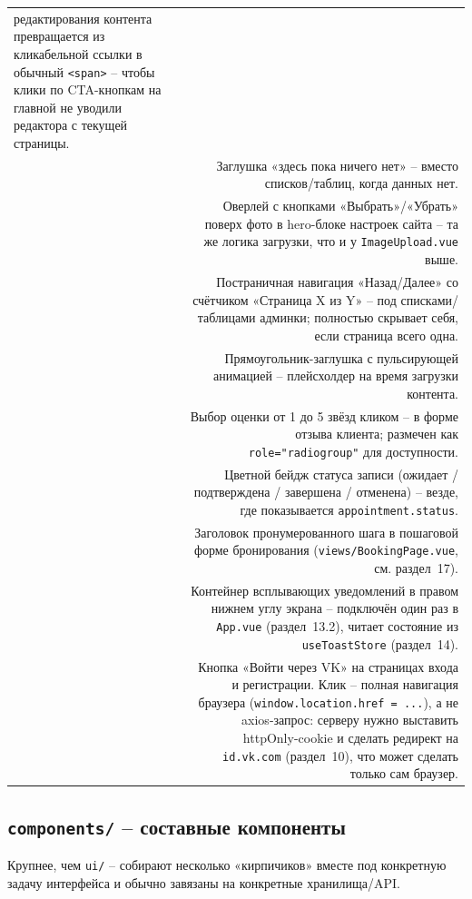 \begin{xltabular}{\textwidth}{M D}
  редактирования контента превращается из кликабельной ссылки в обычный
  \texttt{<span>} -- чтобы клики по CTA-кнопкам на главной не уводили
  редактора с текущей страницы. \\
 & Заглушка «здесь пока ничего нет» -- вместо
  списков/таблиц, когда данных нет. \\
 & Оверлей с кнопками «Выбрать»/«Убрать»
  поверх фото в hero-блоке настроек сайта -- та же логика загрузки, что и
  у \texttt{ImageUpload.vue} выше. \\
 & Постраничная навигация «Назад/Далее» со
  счётчиком «Страница X из Y» -- под списками/таблицами админки; полностью
  скрывает себя, если страница всего одна. \\
 & Прямоугольник-заглушка с пульсирующей анимацией
  -- плейсхолдер на время загрузки контента. \\
 & Выбор оценки от 1 до 5 звёзд кликом -- в
  форме отзыва клиента; размечен как \texttt{role="radiogroup"} для
  доступности. \\
 & Цветной бейдж статуса записи (ожидает /
  подтверждена / завершена / отменена) -- везде, где показывается
  \texttt{appointment.status}. \\
 & Заголовок пронумерованного шага в пошаговой
  форме бронирования (\texttt{views/BookingPage.vue}, см. раздел~17). \\
 & Контейнер всплывающих уведомлений в правом
  нижнем углу экрана -- подключён один раз в \texttt{App.vue}
  (раздел~13.2), читает состояние из \texttt{useToastStore} (раздел~14). \\
 & Кнопка «Войти через VK» на страницах входа
  и регистрации. Клик -- полная навигация браузера
  (\texttt{window.location.href = ...}), а не axios-запрос: серверу
  нужно выставить httpOnly-cookie и сделать редирект на \texttt{id.vk.com}
  (раздел~10), что может сделать только сам браузер. \\
\end{xltabular}

\subsection{\texttt{components/} -- составные компоненты}

Крупнее, чем \texttt{ui/} -- собирают несколько «кирпичиков» вместе под
конкретную задачу интерфейса и обычно завязаны на конкретные
хранилища/API.

